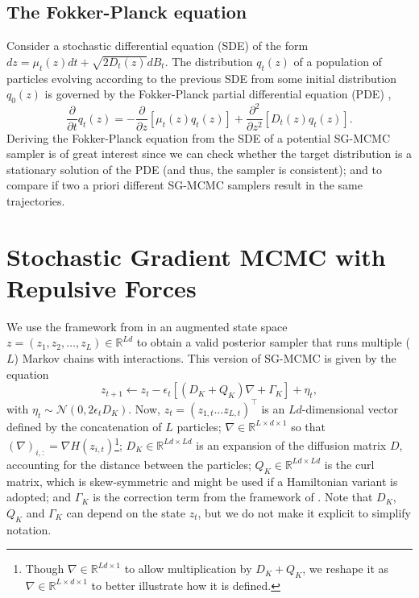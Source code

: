\subsection{The Fokker-Planck equation}\label{sec:fp}
Consider a stochastic differential equation (SDE) of the form $d{z} = \mu_t({z})dt + \sqrt{2 D_t({z})}dB_t$. The distribution $q_t({z})$ of a population of particles evolving according to the previous SDE from some initial distribution $q_0({z})$ is governed by the Fokker-Planck partial differential equation (PDE) \parencite{risken-fpe-1989},
$$
\frac{\partial}{\partial t} q_t({z}) = -\frac{\partial}{\partial {z}} \left[ \mu_t({z}) q_t({z})\right] + \frac{\partial^2}{\partial {z}^2} \left[ D_t({z})q_t({z})\right].
$$
Deriving the Fokker-Planck equation from the SDE of a potential SG-MCMC sampler is of great interest since we can check whether the target distribution is a stationary solution of the PDE (and thus, the sampler is consistent); and to compare if two a priori different SG-MCMC samplers result in the same trajectories.






\section{Stochastic Gradient MCMC with Repulsive Forces}\label{sec:framework}

We use the framework from \textcite{ma2015complete} in an augmented state space ${z} = \left( {z}_{1}, {z}_{2}, \ldots,{z}_{L}\right) \in \mathbb{R}^{Ld}$ to obtain a valid posterior sampler that runs multiple ($L$) Markov chains with interactions. This version of SG-MCMC is given by the equation
\begin{equation}\label{eq:general}
{z}_{t+1} \leftarrow {z}_t -\epsilon_t \left[ ({{D_K}} + {Q_K}){\nabla} + {\Gamma_K} \right] + {\eta}_t,
\end{equation}
with ${\eta}_t \sim \mathcal{N}({0}, 2\epsilon_t {{D_K}})$.
Now, ${z}_t = \left({z}_{1,t} \ldots  {z}_{L,t} \right)^\top$ is an $Ld$-dimensional vector defined by the concatenation of $L$ particles; ${\nabla} \in \mathbb{R}^{L \times d \times 1}$ so that $({\nabla})_{i,:} = \nabla H({z}_{i,t})$\footnote{Though ${\nabla} \in \mathbb{R}^{L d \times 1}$ to allow multiplication by ${D_K} + {Q_K}$, we reshape it as ${\nabla} \in \mathbb{R}^{L\times d \times 1}$ to better illustrate how it is defined.}; ${D_K} \in \mathbb{R}^{Ld\times Ld}$ is an expansion of the diffusion matrix $D$, accounting for the distance between the particles; ${Q_K} \in \mathbb{R}^{Ld\times Ld}$ is the curl matrix, which is skew-symmetric and might be used if a Hamiltonian variant is adopted; and ${\Gamma_K}$ is the correction term from the framework of \textcite{ma2015complete}. Note that ${D_K}$, ${Q_K}$ and ${\Gamma_K}$ can depend on the state ${z}_t$, but we do not make it explicit to simplify notation.

